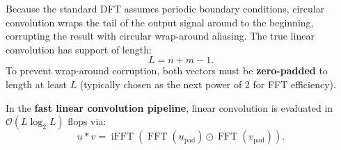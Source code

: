 Because the standard DFT assumes periodic boundary conditions, circular convolution wraps the tail of the output signal around to the beginning, corrupting the result with circular wrap-around aliasing. The true linear convolution has support of length:
\begin{equation}
    L = n + m - 1.
\end{equation}
To prevent wrap-around corruption, both vectors must be \textbf{zero-padded} to length at least $L$ (typically chosen as the next power of 2 for FFT efficiency).

\begin{remark}
    In the \textbf{fast linear convolution pipeline}, linear convolution is evaluated in $\mathcal{O}(L \log_2 L)$ flops via:
    \begin{equation}
        u * v = \operatorname{iFFT}\left( \operatorname{FFT}(u_{\text{pad}}) \odot \operatorname{FFT}(v_{\text{pad}}) \right).
    \end{equation}
\end{remark}
